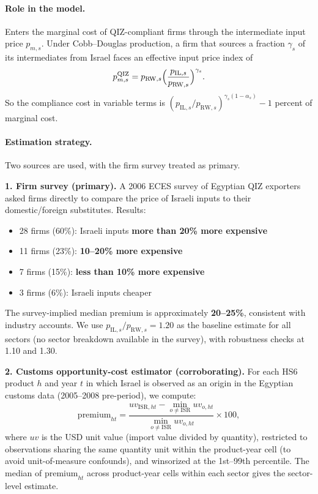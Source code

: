 \documentclass[12pt]{article}
\begin{document}
\paragraph{Role in the model.}
Enters the marginal cost of QIZ-compliant firms through the intermediate
input price $p_{m,s}$. Under Cobb--Douglas production, a firm that sources
a fraction $\gamma_s$ of its intermediates from Israel faces an effective
input price index of
\[
p_{m,s}^{\mathrm{QIZ}} = p_{\mathrm{RW},s}
  \Bigl(\frac{p_{\mathrm{IL},s}}{p_{\mathrm{RW},s}}\Bigr)^{\gamma_s}.
\]
So the compliance cost in variable terms is
$(p_{\mathrm{IL},s}/p_{\mathrm{RW},s})^{\gamma_s(1-\alpha_s)} - 1$
percent of marginal cost.

\paragraph{Estimation strategy.}
Two sources are used, with the firm survey treated as primary.

\medskip
\noindent\textbf{1. Firm survey (primary).}
A 2006 ECES survey of Egyptian QIZ exporters asked firms directly to
compare the price of Israeli inputs to their domestic/foreign substitutes.
Results:
\begin{itemize}
  \item 28 firms (60\%): Israeli inputs \textbf{more than 20\% more expensive}
  \item 11 firms (23\%): \textbf{10--20\% more expensive}
  \item 7 firms (15\%): \textbf{less than 10\% more expensive}
  \item 3 firms (6\%): Israeli inputs cheaper
\end{itemize}
The survey-implied median premium is approximately \textbf{20--25\%},
consistent with industry accounts. We use $p_{\mathrm{IL},s}/p_{\mathrm{RW},s}
= 1.20$ as the baseline estimate for all sectors (no sector breakdown
available in the survey), with robustness checks at 1.10 and 1.30.

\medskip
\noindent\textbf{2. Customs opportunity-cost estimator (corroborating).}
For each HS6 product $h$ and year $t$ in which Israel is observed as an
origin in the Egyptian customs data (2005--2008 pre-period), we compute:
\[
\text{premium}_{ht} =
\frac{uv_{\mathrm{ISR},ht} - \min_{o \neq \mathrm{ISR}} uv_{o,ht}}
     {\min_{o \neq \mathrm{ISR}} uv_{o,ht}} \times 100,
\]
where $uv$ is the USD unit value (import value divided by quantity),
restricted to observations sharing the same quantity unit within the
product-year cell (to avoid unit-of-measure confounds), and winsorized
at the 1st--99th percentile. The median of $\text{premium}_{ht}$ across
product-year cells within each sector gives the sector-level estimate.
\end{document}
